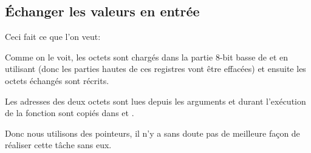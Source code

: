 \subsection{Échanger les valeurs en entrée}

Ceci fait ce que l'on veut:



Comme on le voit, les octets sont chargés dans la partie 8-bit basse de 
et  en utilisant  (donc les parties hautes de ces registres vont
être effacées) et ensuite les octets échangés sont récrits.



Les adresses des deux octets sont lues depuis les arguments et durant l'exécution
de la fonction sont copiés dans  et .

Donc nous utilisons des pointeurs, il n'y a sans doute pas de meilleure façon de
réaliser cette tâche sans eux.

